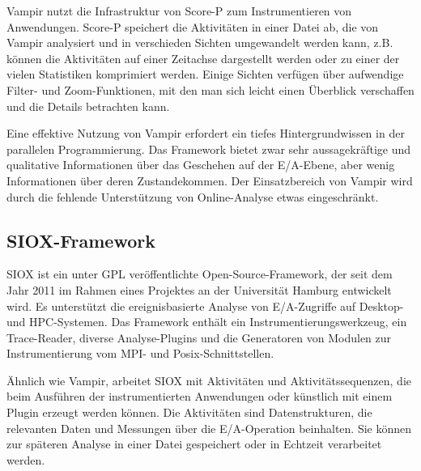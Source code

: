 Vampir nutzt die Infrastruktur von Score-P  zum Instrumentieren von Anwendungen. 
Score-P speichert die Aktivitäten in einer Datei ab, die von Vampir analysiert und in verschieden Sichten umgewandelt werden kann, z.B. können die Aktivitäten auf einer Zeitachse dargestellt werden oder zu einer der vielen Statistiken komprimiert werden. 
Einige Sichten verfügen über aufwendige Filter- und Zoom-Funktionen, mit den man sich leicht einen Überblick verschaffen und die Details betrachten kann.  

Eine effektive Nutzung von Vampir erfordert ein tiefes Hintergrundwissen in der parallelen Programmierung. 
Das Framework bietet zwar sehr aussagekräftige und qualitative Informationen über das Geschehen auf der E/A-Ebene, aber wenig Informationen über deren Zustandekommen. 
Der Einsatzbereich von Vampir wird durch die fehlende Unterstützung von Online-Analyse etwas eingeschränkt.  



\subsection{SIOX-Framework}

SIOX \cite{siox_arch} ist ein unter GPL veröffentlichte Open-Source-Framework, der seit dem Jahr 2011 im Rahmen eines Projektes an der Universität Hamburg entwickelt wird. 
Es unterstützt die ereignisbasierte Analyse von E/A-Zugriffe auf Desktop- und HPC-Systemen. 
Das Framework enthält ein Instrumentierungswerkzeug, ein Trace-Reader, diverse Analyse-Plugins und die Generatoren von Modulen zur Instrumentierung vom MPI- und Posix-Schnittstellen. 

Ähnlich wie Vampir, arbeitet SIOX mit Aktivitäten und Aktivitätssequenzen, die beim Ausführen der instrumentierten Anwendungen oder künstlich mit einem Plugin erzeugt werden können. 
Die Aktivitäten sind Datenstrukturen, die relevanten Daten und Messungen über die E/A-Operation beinhalten. 
Sie können zur späteren Analyse in einer Datei gespeichert oder in Echtzeit verarbeitet werden.

